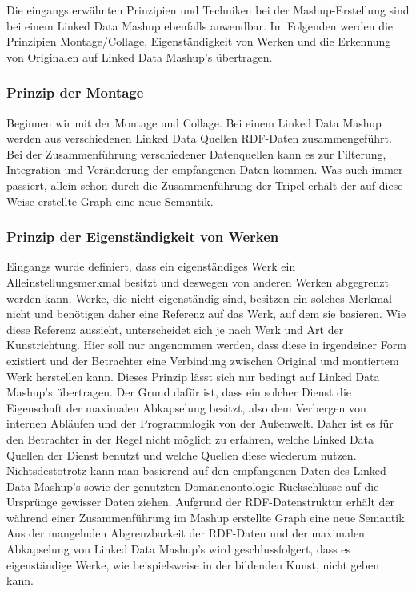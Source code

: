 \documentclass[11pt]{article}
\begin{document}
Die eingangs erwähnten Prinzipien und Techniken bei der Mashup-Erstellung sind bei einem Linked Data Mashup ebenfalls anwendbar. Im Folgenden werden die Prinzipien Montage/Collage, Eigenständigkeit von Werken und die Erkennung von Originalen auf Linked Data Mashup's übertragen.

%
%
\subsubsection{Prinzip der Montage}
\label{sec:MashupPrinciple-Adaption}

Beginnen wir mit der Montage und Collage. Bei einem Linked Data Mashup werden aus verschiedenen Linked Data Quellen RDF-Daten zusammengeführt. Bei der Zusammenführung verschiedener Datenquellen kann es zur Filterung, Integration und Veränderung der empfangenen Daten kommen. Was auch immer passiert, allein schon durch die Zusammenführung der Tripel erhält der auf diese Weise erstellte Graph eine neue Semantik. 


%
%
\subsubsection{Prinzip der Eigenständigkeit von Werken}
\label{sec:MashupPrinciple-Sovereignty}

Eingangs wurde definiert, dass ein eigenständiges Werk ein Alleinstellungsmerkmal besitzt und deswegen von anderen Werken abgegrenzt werden kann. Werke, die nicht eigenständig sind, besitzen ein solches Merkmal nicht und benötigen daher eine Referenz auf das Werk, auf dem sie basieren. Wie diese Referenz aussieht, unterscheidet sich je nach Werk und Art der Kunstrichtung. Hier soll nur angenommen werden, dass diese in irgendeiner Form existiert und der Betrachter eine Verbindung zwischen Original und montiertem Werk herstellen kann. Dieses Prinzip lässt sich nur bedingt auf Linked Data Mashup's übertragen. Der Grund dafür ist, dass ein solcher Dienst die Eigenschaft der maximalen Abkapselung besitzt, also dem Verbergen von internen Abläufen und der Programmlogik von der Außenwelt. Daher ist es für den Betrachter in der Regel nicht möglich zu erfahren, welche Linked Data Quellen der Dienst benutzt und welche Quellen diese wiederum nutzen. Nichtsdestotrotz kann man basierend auf den empfangenen Daten des Linked Data Mashup's sowie der genutzten Domänenontologie Rückschlüsse auf die Ursprünge gewisser Daten ziehen. Aufgrund der RDF-Datenstruktur erhält der während einer Zusammenführung im Mashup erstellte Graph eine neue Semantik. Aus der mangelnden Abgrenzbarkeit der RDF-Daten und der maximalen Abkapselung von Linked Data Mashup's wird geschlussfolgert, dass es eigenständige Werke, wie beispielsweise in der bildenden Kunst, nicht geben kann.
\end{document}
